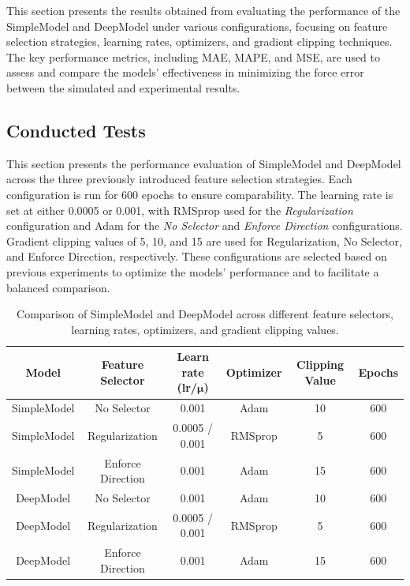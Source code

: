 \setlength{\textwidthMultiplier}{0.45\textwidth}

This section presents the results obtained from evaluating the performance of the SimpleModel and DeepModel under various configurations, focusing on feature selection strategies, learning rates, optimizers, and gradient clipping techniques. The key performance metrics, including MAE, MAPE, and MSE, are used to assess and compare the models' effectiveness in minimizing the force error between the simulated and experimental results.

\subsection{Conducted Tests}

This section presents the performance evaluation of SimpleModel and DeepModel across the three previously introduced feature selection strategies. Each configuration is run for 600 epochs to ensure comparability. The learning rate is set at either 0.0005 or 0.001, with RMSprop used for the \textit{Regularization} configuration and Adam for the \textit{No Selector} and \textit{Enforce Direction} configurations. Gradient clipping values of 5, 10, and 15 are used for Regularization, No Selector, and Enforce Direction, respectively. These configurations are selected based on previous experiments to optimize the models' performance and to facilitate a balanced comparison.

\begin{table}[h]
    \centering
    \begin{tabular}{|c|c|c|c|c|c|}
        \hline
        \textbf{Model} & \textbf{Feature Selector} & \textbf{Learn rate (lr/{$\boldsymbol\mu$)}} & \textbf{Optimizer} & \textbf{Clipping Value} & \textbf{Epochs} \\ \hline
        SimpleModel & No Selector        & 0.001              & Adam      & 10             & 600    \\ \hline
        SimpleModel & Regularization     & 0.0005 / 0.001     & RMSprop   & 5              & 600    \\ \hline
        SimpleModel & Enforce Direction  & 0.001              & Adam      & 15             & 600    \\ \hline
        DeepModel   & No Selector        & 0.001              & Adam      & 10             & 600    \\ \hline
        DeepModel   & Regularization     & 0.0005 / 0.001     & RMSprop   & 5              & 600    \\ \hline
        DeepModel   & Enforce Direction  & 0.001              & Adam      & 15             & 600    \\ \hline
    \end{tabular}
    \caption{Comparison of SimpleModel and DeepModel across different feature selectors, learning rates, optimizers, and gradient clipping values.}
    \label{tab:configurations}
\end{table}



